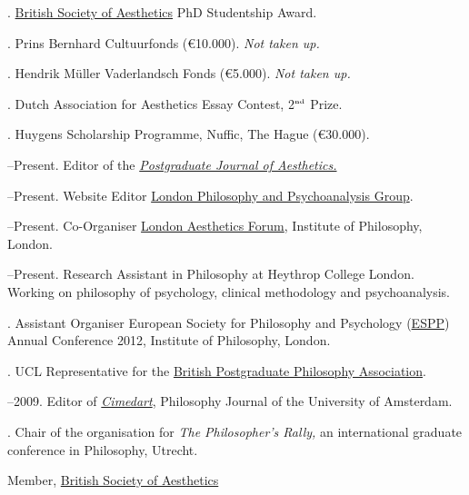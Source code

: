 \documentclass[11pt]{article}
\begin{document}
\medskip

. \href{http://www.british-aesthetics.org}{British Society of Aesthetics} PhD Studentship Award. %

. Prins Bernhard Cultuurfonds (€10.000). \emph{Not taken up.}

. Hendrik Müller Vaderlandsch Fonds (€5.000). \emph{Not taken up.} 

. Dutch Association for Aesthetics Essay Contest, 2$^{\textrm{\tiny{nd}}}$ Prize.

. Huygens Scholarship Programme, Nuffic, The Hague (€30.000).

\bigskip 

\medskip

--Present. Editor of the \href{http:\\www.pjaesthetics.org}{\emph{Postgraduate Journal of Aesthetics.}}

--Present. Website Editor \href{http://www.philosophy-psychoanalysis.org.uk}{London Philosophy and Psychoanalysis Group}.

--Present. Co-Organiser \href{http:\\www.londonaestheticsforum.org}{London Aesthetics Forum}, Institute of Philosophy, London.

--Present. Research Assistant in Philosophy at Heythrop College London. Working on philosophy of psychology, clinical methodology and psychoanalysis.

. Assistant Organiser European Society for Philosophy and Psychology (\href{http://www.eurospp.org}{ESPP}) Annual Conference 2012, Institute of Philosophy, London. 

. UCL Representative for the \href{http://www.bppa-online.org}{British Postgraduate Philosophy Association}.

--2009. Editor of \href{http://www.cimedart.nl}{\emph{Cimedart}}, Philosophy Journal of the University of Amsterdam.

. Chair of the organisation for \emph{The Philosopher's Rally,} an international graduate conference in Philosophy, Utrecht.

\bigskip 


\ind Member, \href{http://www.philosophy-psychoanalysis.org.uk}{British Society of Aesthetics}
\end{document}
